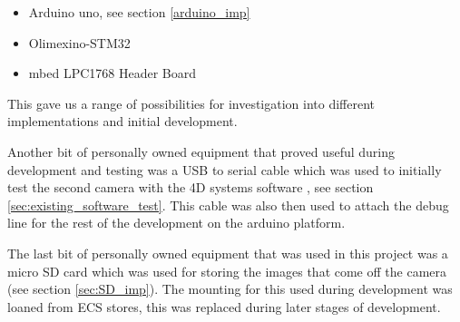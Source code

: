 \begin{itemize}
	\item Arduino uno, see section \ref{arduino_imp} \cite{arduino_serial_library}
	\item Olimexino-STM32 \cite{olimexino}
	\item mbed LPC1768 Header Board \cite{mbed}
\end{itemize}

This gave us a range of possibilities for investigation into different implementations and initial development.

Another bit of personally owned equipment that proved useful during development and testing was a USB to serial cable which was used to initially test the second camera with the 4D systems software \cite{ucam_test_software}, see section \ref{sec:existing_software_test}. This cable was also then used to attach the debug line for the rest of the development on the arduino platform.

The last bit of personally owned equipment that was used in this project was a micro SD card which was used for storing the images that come off the camera (see section \ref{sec:SD_imp}). The mounting for this used during development was loaned from ECS stores, this was replaced during later stages of development.